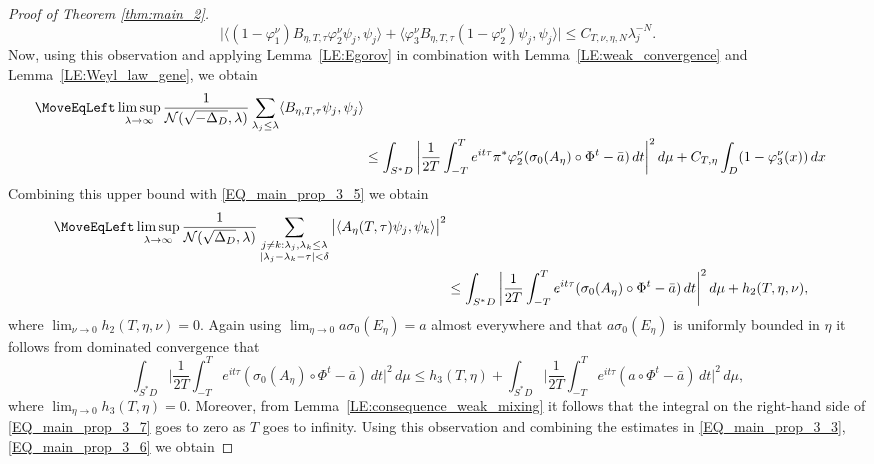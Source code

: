 \documentclass[11pt,twoside,reqno]{amsart}
\newcommand{\1}{\mathrm{\mathbf{1}}}
\numberwithin{equation}{section}
\theoremstyle{plain}
\theoremstyle{definition}
\theoremstyle{remark}
\begin{document}
\begin{proof}[Proof of Theorem \ref{thm:main_2}]
\begin{equation}
    \big|\langle (1-\varphi_1^\nu) B_{\eta,T,\tau} \varphi_2^\nu \psi_j , \psi_j\rangle +\langle \varphi_3^\nu B_{\eta,T,\tau}(1- \varphi_2^\nu) \psi_j , \psi_j\rangle \big| \leq C_{T,\nu,\eta,N} \lambda_j^{-N}.
\end{equation}
Now, using this observation and applying Lemma~\ref{LE:Egorov} in combination with Lemma~\ref{LE:weak_convergence} and Lemma~\ref{LE:Weyl_law_gene}, we obtain
\begin{equation*}
    \begin{aligned}
     \MoveEqLeft 
     \limsup_{\lambda\rightarrow\infty}\frac{1 }{\mathcal{N}(\sqrt{-\Delta_D},\lambda)} \sum_{\lambda_j \leq \lambda} \langle B_{\eta,T,\tau} \psi_j , \psi_j\rangle
     \\
    &\leq \int_{S^*D} \bigg| \frac{1}{2T} \int_{-T}^{T} e^{it\tau} \pi^{*}\varphi^\nu_2 (\sigma_0(A_\eta)\circ\Phi^t - \bar{a}) \, dt \bigg|^2 \, d\mu + C_{T,\eta} \int_{D} (1-\varphi_3^\nu(x)) \, dx 
    \end{aligned}
\end{equation*}
Combining this upper bound with \eqref{EQ_main_prop_3_5} we obtain
\begin{equation}\label{EQ_main_prop_3_6}
    \begin{aligned}
        \MoveEqLeft \limsup_{\lambda\rightarrow\infty} \frac{1}{\mathcal{N}(\sqrt{\Delta_D},\lambda)} \sum_{\substack{j\neq k: \lambda_j,\lambda_k\leq \lambda  \\ |\lambda_{j}-\lambda_{k}-\tau| < \delta}} \big| \langle A_\eta(T,\tau) \psi_j , \psi_k\rangle  \big|^2 
        \\
        &\leq  
        \int_{S^*D} \bigg| \frac{1}{2T} \int_{-T}^{T}e^{it\tau} ( \sigma_0(A_\eta)\circ\Phi^t - \bar{a}) \, dt \bigg|^2 \, d\mu  + h_{2}(T,\eta,\nu),
        \end{aligned}
\end{equation}
where $\lim_{\nu\rightarrow 0} h_{2}(T,\eta,\nu)=0$. Again using $\lim_{\eta\rightarrow 0} a\sigma_0(E_\eta)=a$ almost everywhere and that $a\sigma_0(E_\eta)$ is uniformly bounded in $\eta$ it follows from dominated convergence that
\begin{equation}\label{EQ_main_prop_3_7}
        \int_{S^*D} \bigg| \frac{1}{2T} \int_{-T}^{T} e^{it\tau} (\sigma_0(A_\eta)\circ\Phi^t - \bar{a}) \, dt \bigg|^2 \, d\mu  \leq  h_3(T,\eta)+ \int_{S^*D} \bigg| \frac{1}{2T} \int_{-T}^{T} e^{it\tau}  ( a\circ\Phi^t - \bar{a}) \, dt \bigg|^2 \, d\mu,
\end{equation}
where $\lim_{\eta\rightarrow 0} h_3(T,\eta)=0$. Moreover, from Lemma~\ref{LE:consequence_weak_mixing} it follows that the integral on the right-hand side of \eqref{EQ_main_prop_3_7} goes to zero as $T$ goes to infinity. Using this observation and combining the estimates in \eqref{EQ_main_prop_3_3}, \eqref{EQ_main_prop_3_6} we obtain 

\end{proof}
\end{document}

